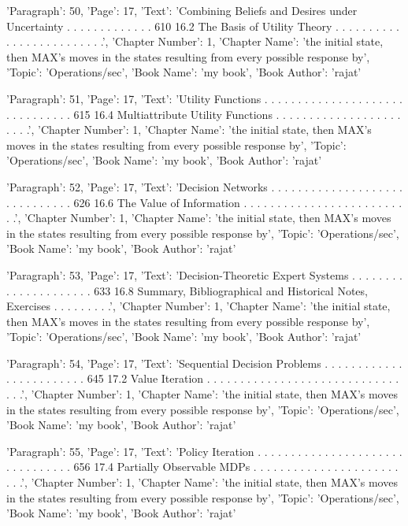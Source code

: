 {'Paragraph': 50, 'Page': 17, 'Text': 'Combining Beliefs and Desires under Uncertainty . . . . . . . . . . . . . 610 16.2 The Basis of Utility Theory . . . . . . . . . . . . . . . . . . . . . . . . .', 'Chapter Number': 1, 'Chapter Name': 'the initial state, then MAX’s moves in the states resulting from every possible response by', 'Topic': 'Operations/sec', 'Book Name': 'my book', 'Book Author': 'rajat'}

{'Paragraph': 51, 'Page': 17, 'Text': 'Utility Functions . . . . . . . . . . . . . . . . . . . . . . . . . . . . . . . 615 16.4 Multiattribute Utility Functions . . . . . . . . . . . . . . . . . . . . . . .', 'Chapter Number': 1, 'Chapter Name': 'the initial state, then MAX’s moves in the states resulting from every possible response by', 'Topic': 'Operations/sec', 'Book Name': 'my book', 'Book Author': 'rajat'}

{'Paragraph': 52, 'Page': 17, 'Text': 'Decision Networks . . . . . . . . . . . . . . . . . . . . . . . . . . . . . . 626 16.6 The Value of Information . . . . . . . . . . . . . . . . . . . . . . . . . .', 'Chapter Number': 1, 'Chapter Name': 'the initial state, then MAX’s moves in the states resulting from every possible response by', 'Topic': 'Operations/sec', 'Book Name': 'my book', 'Book Author': 'rajat'}

{'Paragraph': 53, 'Page': 17, 'Text': 'Decision-Theoretic Expert Systems . . . . . . . . . . . . . . . . . . . . . 633 16.8 Summary, Bibliographical and Historical Notes, Exercises . . . . . . . . .', 'Chapter Number': 1, 'Chapter Name': 'the initial state, then MAX’s moves in the states resulting from every possible response by', 'Topic': 'Operations/sec', 'Book Name': 'my book', 'Book Author': 'rajat'}

{'Paragraph': 54, 'Page': 17, 'Text': 'Sequential Decision Problems . . . . . . . . . . . . . . . . . . . . . . . . 645 17.2 Value Iteration . . . . . . . . . . . . . . . . . . . . . . . . . . . . . . . .', 'Chapter Number': 1, 'Chapter Name': 'the initial state, then MAX’s moves in the states resulting from every possible response by', 'Topic': 'Operations/sec', 'Book Name': 'my book', 'Book Author': 'rajat'}

{'Paragraph': 55, 'Page': 17, 'Text': 'Policy Iteration . . . . . . . . . . . . . . . . . . . . . . . . . . . . . . . . 656 17.4 Partially Observable MDPs . . . . . . . . . . . . . . . . . . . . . . . . .', 'Chapter Number': 1, 'Chapter Name': 'the initial state, then MAX’s moves in the states resulting from every possible response by', 'Topic': 'Operations/sec', 'Book Name': 'my book', 'Book Author': 'rajat'}

